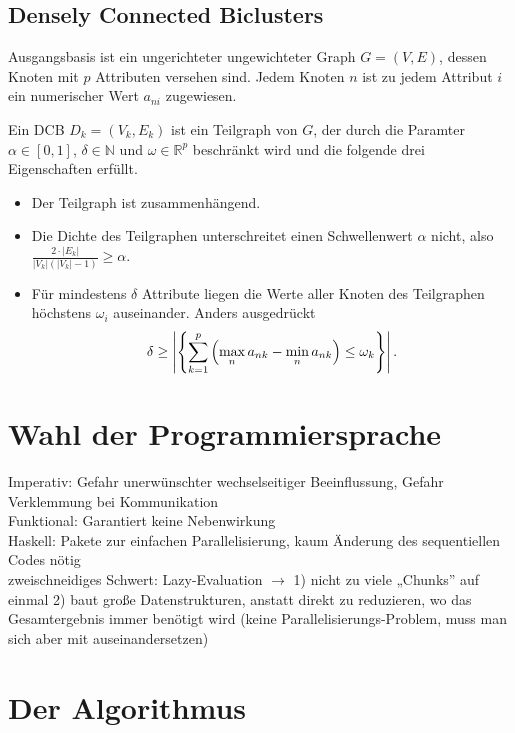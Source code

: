 \documentclass[a4paper]{scrartcl}
\newcommand{\en}[1]{\selectlanguage{USenglish}#1\selectlanguage{ngerman}}
\newcommand{\card}[1]{\left\vert #1 \right\vert} %
\newcommand{\setR}{\mathbb{R}}
\newcommand{\setN}{\mathbb{N}}
\begin{document}
\en{
\subsection{Densely Connected Biclusters}
}

Ausgangsbasis ist ein ungerichteter ungewichteter Graph $G = (V, E)$, dessen Knoten mit $p$ Attributen versehen sind. Jedem Knoten $n$ ist zu jedem Attribut $i$ ein numerischer Wert $a_{ni}$ zugewiesen. \par
Ein DCB $D_k = (V_k, E_k)$ ist ein Teilgraph von $G$, der durch die Paramter $\alpha \in [0, 1]$, $\delta \in \setN$ und $\omega \in \setR^p$ beschränkt wird und die folgende drei Eigenschaften erfüllt.
\begin{itemize}
\item Der Teilgraph ist zusammenhängend.
\item Die Dichte des Teilgraphen unterschreitet einen Schwellenwert $\alpha$ nicht, also $\frac{2 \cdot \card{E_k}}{\card{V_k}(\card{V_k}-1)} \geq \alpha$.
\item Für mindestens $\delta$ Attribute liegen die Werte aller Knoten des Teilgraphen höchstens $\omega_i$ auseinander. Anders ausgedrückt
\begin{equation*}
\delta \geq \card{\left\lbrace \sum_{k=1}^p \left(\max_n a_{nk} - \min_n a_{nk}\right) \leq \omega_{k} \right\rbrace}\text{\@.}
\end{equation*}
\end{itemize}

\section{Wahl der Programmiersprache}

Imperativ: Gefahr unerwünschter wechselseitiger Beeinflussung, Gefahr Verklemmung bei Kommunikation\\
Funktional: Garantiert keine Nebenwirkung\\
Haskell: Pakete zur einfachen Parallelisierung, kaum Änderung des sequentiellen Codes nötig\\
zweischneidiges Schwert: Lazy-Evaluation $\rightarrow$ 1) nicht zu viele „Chunks” auf einmal 2) baut große Datenstrukturen, anstatt direkt zu reduzieren, wo das Gesamtergebnis immer benötigt wird (keine Parallelisierungs-Problem, muss man sich aber mit auseinandersetzen)


\section{Der Algorithmus}
\end{document}
